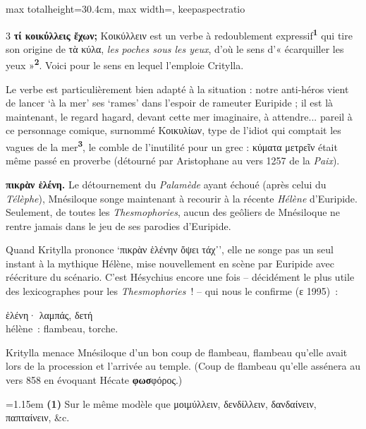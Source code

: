 \documentclass[11pt,twoside]{book}
\newcommand{\italique}[1]{\textit{#1}}
\newcommand{\citComm}[1]{\begin{quoting}[vskip=0.4pt,leftmargin=0.7em,rightmargin=0.2em]#1\end{quoting}}
\newcommand{\francais}[1]{{\policeFr #1}}
\newcommand{\marqueur}[1]{\textsuperscript{\color{rubricRed}\textbf{#1}}}
\begin{document}
\begin{adjustbox}{max totalheight=30.4cm, max width=\textwidth, keepaspectratio}
\begin{minipage}{\textwidth}
{\begin{multicols}{3}
 \textbf{τί κοικύλλεις ἔχων;} Κοικύλλειν est un verbe à redoublement expressif\marqueur{1} qui tire son origine de τὰ κύλα, \italique{les poches sous les yeux}, d'où le sens d'« écarquiller les yeux »\marqueur{2}. Voici pour le sens en lequel l'emploie Critylla.
\par\vspace{1.5pt}
\noindent Le verbe est particulièrement bien adapté à la situation : notre anti-héros vient de lancer `à la mer' ses `rames' dans l'espoir de rameuter Euripide ; il est là maintenant, le regard hagard, devant cette mer imaginaire, à attendre... pareil à ce personnage comique, surnommé Κοικυλίων, type de l'idiot qui comptait les vagues de la mer\marqueur{3}, le comble de l'inutilité pour un grec : κύματα μετρεῖν était même passé en proverbe (détourné par Aristophane au vers 1257 de la \italique{Paix}).
\par\vspace{1.5pt}
 \textbf{πικρὰν ἑλένη.} Le détournement du \italique{Palamède} ayant échoué (après celui du \italique{Télèphe}), Mnésiloque songe maintenant à recourir à la récente \italique{Hélène} d'Euripide. Seulement, de toutes les \italique{Thesmophories}, aucun des geôliers de Mnésiloque ne rentre jamais dans le jeu de ses parodies d'Euripide.
\par\vspace{1.5pt}
\noindent Quand Kritylla prononce `πικρὰν ἑλένην ὄψει τάχ᾽', elle ne songe pas un seul instant à la mythique Hélène, mise nouvellement en scène par Euripide avec réécriture du scénario. C'est Hésychius encore une fois – décidément le plus utile des lexicographes pour les \italique{Thesmophories}~! – qui nous le confirme (ε 1995)~:
\citComm{ἑλένη· λαμπάς, δετή\\
\francais{hélène~: flambeau, torche.}}
\par\vspace{1.5pt}
\noindent Kritylla menace Mnésiloque d'un bon coup de flambeau, flambeau qu'elle avait lors de la procession et l'arrivée au temple. (Coup de flambeau qu'elle assénera au vers 858 en évoquant Hécate \textbf{φωσ}φόρος.)
\par\vspace{1.5pt}
\par\vspace{1.2pt}\par\nopagebreak\vspace{1pt}\noindent\hangindent=1.15em {\color{sepiaNote}\textbf{(1)}} Sur le même modèle que μοιμύλλειν, δενδίλλειν, δανδαίνειν, παπταίνειν, \&c.

\end{multicols}}
\end{minipage}
\end{adjustbox}
\end{document}
